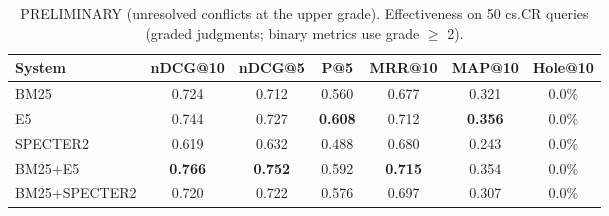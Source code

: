 \begin{table}[t]
\centering
\small
\caption{PRELIMINARY (unresolved conflicts at the upper grade). Effectiveness on 50 cs.CR queries (graded judgments; binary metrics use grade $\geq$ 2).}
\label{tab:main}
\begin{tabular}{lcccccc}
\toprule
System & nDCG@10 & nDCG@5 & P@5 & MRR@10 & MAP@10 & Hole@10 \\
\midrule
BM25 & 0.724 & 0.712 & 0.560 & 0.677 & 0.321 & 0.0\% \\
E5 & 0.744 & 0.727 & \textbf{0.608} & 0.712 & \textbf{0.356} & 0.0\% \\
SPECTER2 & 0.619 & 0.632 & 0.488 & 0.680 & 0.243 & 0.0\% \\
BM25+E5 & \textbf{0.766} & \textbf{0.752} & 0.592 & \textbf{0.715} & 0.354 & 0.0\% \\
BM25+SPECTER2 & 0.720 & 0.722 & 0.576 & 0.697 & 0.307 & 0.0\% \\
\bottomrule
\end{tabular}
\end{table}
